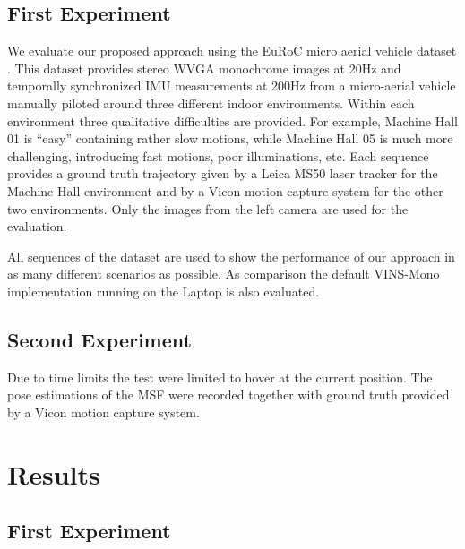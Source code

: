 \subsection{First Experiment}\label{subsec:experiment1}
We evaluate our proposed approach using the EuRoC micro aerial vehicle dataset 
\citep{Burri2016EuRoC}. This dataset provides stereo WVGA monochrome images at 
20Hz and temporally synchronized \ac{IMU} measurements at 200Hz from a 
micro-aerial vehicle manually piloted around three different indoor 
environments. Within each environment three qualitative difficulties are 
provided. For example, Machine Hall 01 is ``easy'' containing 
rather slow motions, while Machine Hall 05 is much more challenging, 
introducing fast motions, poor illuminations, etc. Each sequence 
provides a ground truth trajectory given by a Leica MS50 laser tracker for the 
Machine Hall environment and by a Vicon motion capture system for the 
other two environments. Only the images from the left camera are used for the 
evaluation.

All sequences of the dataset are used to show the performance of 
our approach in as many different scenarios as possible. 
As comparison the default VINS-Mono implementation running on the Laptop is 
also evaluated.

\subsection{Second Experiment}\label{subsec:experiment2}

Due to time limits the test were limited to hover at the current position. The 
pose estimations of the \ac{MSF} were recorded together with ground truth 
provided by a Vicon motion capture system.



\section{Results}\label{sec:results}

\subsection{First Experiment}\label{subsec:result1}

